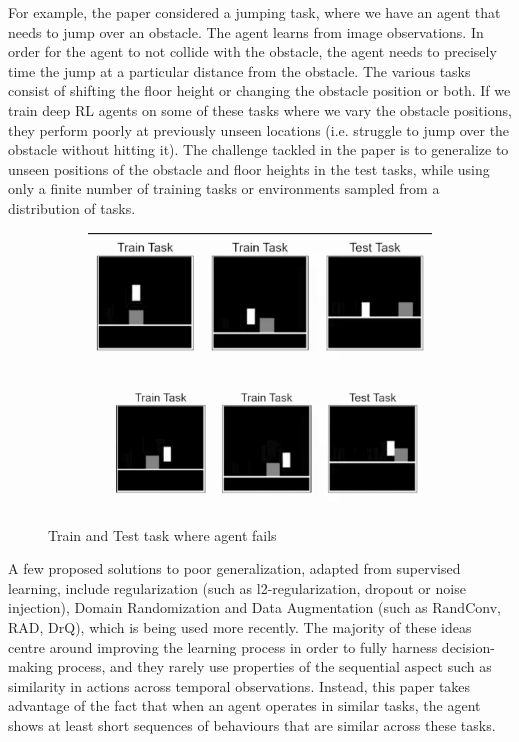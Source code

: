 \documentclass{usiinftr}
\begin{document}
For example, the paper considered a jumping task, where we have an agent that needs to jump over an obstacle. The agent learns from image observations. In order for the agent to not collide with the obstacle, the agent needs to precisely time the jump at a particular distance from the obstacle. The various tasks consist of shifting the floor height or changing the obstacle position or both. If we train deep RL agents on some of these tasks where we vary the obstacle positions, they perform poorly at previously unseen locations (i.e. struggle to jump over the obstacle without hitting it). The challenge tackled in the paper is to generalize to unseen positions of the obstacle and floor heights in the test tasks, while using only a finite number of training tasks or environments sampled from a distribution of tasks.

\begin{figure}[h]
    \centering
    \begin{subfigure}
        \centering
        \includegraphics[width = 0.45\linewidth]{figures/image1.png}
        \label{}
    \end{subfigure}%
    \begin{subfigure}
        \centering
        \includegraphics[width = 0.5\linewidth]{figures/image2.png}
        \label{}
    \end{subfigure}
    \caption{Train and Test task where agent fails}
    \label{fig:TrainTestTask}
\end{figure}

A few proposed solutions to poor generalization, adapted from supervised learning, include regularization (such as l2-regularization, dropout or noise injection), Domain Randomization and Data Augmentation (such as RandConv, RAD, DrQ), which is being used more recently. The majority of these ideas centre around improving the learning process in order to fully harness decision-making process, and they rarely use properties of the sequential aspect such as similarity in actions across temporal observations. Instead, this paper takes advantage of the fact that when an agent operates in similar tasks, the agent shows at least short sequences of behaviours that are similar across these tasks.
\end{document}

